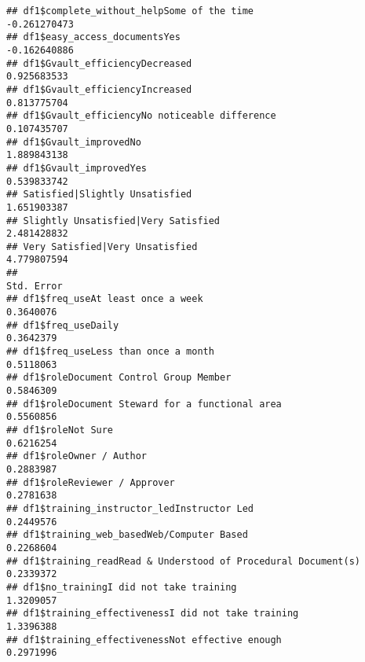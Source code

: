 \documentclass[]{article}
\begin{document}
\begin{verbatim}
## df1$complete_without_helpSome of the time                                                    -0.261270473
## df1$easy_access_documentsYes                                                                 -0.162640886
## df1$Gvault_efficiencyDecreased                                                                0.925683533
## df1$Gvault_efficiencyIncreased                                                                0.813775704
## df1$Gvault_efficiencyNo noticeable difference                                                 0.107435707
## df1$Gvault_improvedNo                                                                         1.889843138
## df1$Gvault_improvedYes                                                                        0.539833742
## Satisfied|Slightly Unsatisfied                                                                1.651903387
## Slightly Unsatisfied|Very Satisfied                                                           2.481428832
## Very Satisfied|Very Unsatisfied                                                               4.779807594
##                                                                                              Std. Error
## df1$freq_useAt least once a week                                                              0.3640076
## df1$freq_useDaily                                                                             0.3642379
## df1$freq_useLess than once a month                                                            0.5118063
## df1$roleDocument Control Group Member                                                         0.5846309
## df1$roleDocument Steward for a functional area                                                0.5560856
## df1$roleNot Sure                                                                              0.6216254
## df1$roleOwner / Author                                                                        0.2883987
## df1$roleReviewer / Approver                                                                   0.2781638
## df1$training_instructor_ledInstructor Led                                                     0.2449576
## df1$training_web_basedWeb/Computer Based                                                      0.2268604
## df1$training_readRead & Understood of Procedural Document(s)                                  0.2339372
## df1$no_trainingI did not take training                                                        1.3209057
## df1$training_effectivenessI did not take training                                             1.3396388
## df1$training_effectivenessNot effective enough                                                0.2971996

\end{verbatim}
\end{document}
